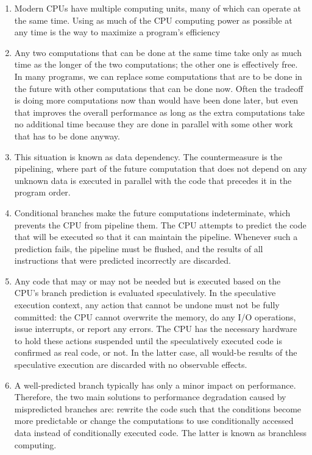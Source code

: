 \begin{enumerate}
\item 
Modern CPUs have multiple computing units, many of which can operate at the same time. Using as much of the CPU computing power as possible at any time is the way to maximize a program's efficiency

\item 
Any two computations that can be done at the same time take only as much time as the longer of the two computations; the other one is effectively free. In many programs, we can replace some computations that are to be done in the future with other computations that can be done now. Often the tradeoff is doing more computations now than would have been done later, but even that improves the overall performance as long as the extra computations take no additional time because they are done in parallel with some other work that has to be done anyway.

\item 
This situation is known as data dependency. The countermeasure is the pipelining, where part of the future computation that does not depend on any unknown data is executed in parallel with the code that precedes it in the program order.

\item
Conditional branches make the future computations indeterminate, which prevents the CPU from pipeline them. The CPU attempts to predict the code that will be executed so that it can maintain the pipeline. Whenever such a prediction fails, the pipeline must be flushed, and the results of all instructions that were predicted incorrectly are discarded.

\item
Any code that may or may not be needed but is executed based on the CPU's branch prediction is evaluated speculatively. In the speculative execution context, any action that cannot be undone must not be fully committed: the CPU cannot overwrite the memory, do any I/O operations, issue interrupts, or report any errors. The CPU has the necessary hardware to hold these actions suspended until the speculatively executed code is confirmed as real code, or not. In the latter case, all would-be results of the speculative execution are discarded with no observable effects.

\item 
A well-predicted branch typically has only a minor impact on performance. Therefore, the two main solutions to performance degradation caused by mispredicted branches are: rewrite the code such that the conditions become more predictable or change the computations to use conditionally accessed data instead of conditionally executed code. The latter is known as branchless computing.
	
\end{enumerate}
